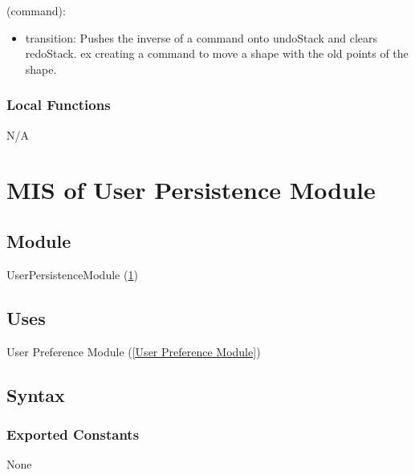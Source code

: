 \documentclass[12pt, titlepage]{article}
\begin{document}
(command):
\begin{itemize}
\item transition: Pushes the inverse of a command onto undoStack and clears redoStack. ex creating a command to move a shape with the old points of the shape. 
\end{itemize}

%

\subsubsection{Local Functions}
N/A

\newpage
\section{MIS of {User Persistence Module}} \label{User Persistence Module}

%

\subsection{Module}
UserPersistenceModule (\ref{User Persistence Module})


\subsection{Uses}
{User Preference Module} (\ref{User Preference Module})

\subsection{Syntax}

\subsubsection{Exported Constants}
None
\end{document}
